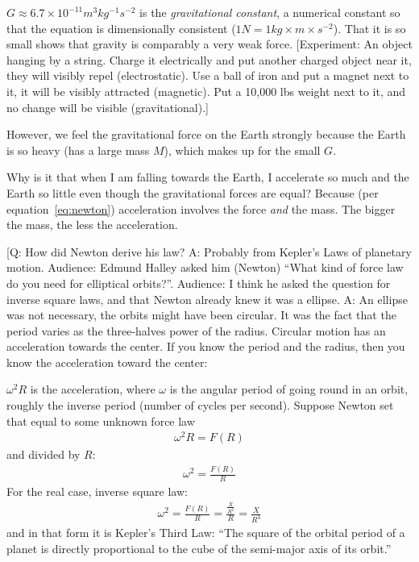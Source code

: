 \documentclass[pagesize,headsepline,10pt,parskip=half,BCOR=12mm]{scrreprt}
\begin{document}
        $G \approx 6.7 \times 10^{-11} m^3 kg^{-1} s^{-2}$ is the
        \emph{gravitational constant}, a numerical constant so that
        the equation is dimensionally consistent ($1 N = 1 kg
        \times m \times s^{-2}$).
        That it is so small shows that gravity is comparably a very
        weak force.
        [Experiment: An object hanging by a string. Charge it
        electrically and put another charged object near it, they
        will visibly repel (electrostatic). Use a ball of iron and
        put a magnet next to it, it will be visibly attracted
        (magnetic). Put a 10,000 lbs weight next to it, and no
        change will be visible (gravitational).]

        However, we feel the gravitational force on the Earth
        strongly because the Earth is so heavy (has a large mass
        $M$), which makes up for the small $G$.

        Why is it that when I am falling towards the Earth, I
        accelerate so much and the Earth so little even though the
        gravitational forces are equal? Because (per equation~\ref{eq:newton}) acceleration involves the force \emph{and}
        the mass.  The bigger the mass, the less the acceleration.

        [Q: How did Newton derive his law? A: Probably from
        Kepler's Laws of planetary motion. Audience: Edmund Halley
        asked him (Newton) ``What kind of force law do you need for
        elliptical orbits?''. Audience: I think he asked the
        question for inverse square laws, and that Newton already
        knew it was a ellipse.
        A: An ellipse was not necessary, the orbits might have been
        circular.  It was the fact that the period varies as the
        three-halves power of the radius. Circular motion has an
        acceleration towards the center. If you know the period and
        the radius, then you know the acceleration toward the
        center:

        $\omega^2 R$ is the acceleration, where $\omega$ is the
        angular period of going round in an orbit, roughly the
        inverse period (number of cycles per second).  Suppose
        Newton set that equal to some unknown force law
        \begin{align}
          \omega^2 R = F(R)
        \end{align}
        and divided by $R$:
        \begin{align}
          \omega^2 = \frac{F(R)}{R}
        \end{align}
        For the real case, inverse square law:
        \begin{align}
          \omega^2 = \frac{F(R)}{R} = \frac{\frac{X}{R^2}}{R} =
          \frac{X}{R^3}
        \end{align}
        and in that form it is Kepler's Third Law: ``The square of
        the orbital period of a planet is directly proportional to
        the cube of the semi-major axis of its orbit.''
\end{document}
